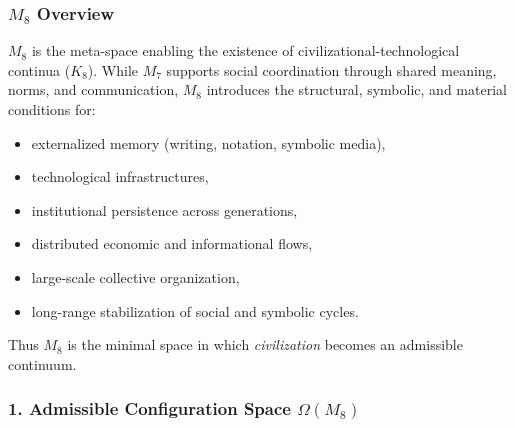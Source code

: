 

\subsubsection{\texorpdfstring{$M_8$}{M_8} Overview}
\label{sec:m8-overview}

$M_8$ is the meta-space enabling the existence of 
civilizational-technological continua ($K_8$). 
While $M_7$ supports social coordination through shared meaning, norms, and 
communication, $M_8$ introduces the structural, symbolic, and material 
conditions for:

\begin{itemize}
    \item externalized memory (writing, notation, symbolic media),
    \item technological infrastructures,
    \item institutional persistence across generations,
    \item distributed economic and informational flows,
    \item large-scale collective organization,
    \item long-range stabilization of social and symbolic cycles.
\end{itemize}

Thus $M_8$ is the minimal space in which \emph{civilization} becomes an admissible continuum.

\subsubsection*{1. Admissible Configuration Space \texorpdfstring{$\Omega(M_8)$}{\Omega(M_8)}}

